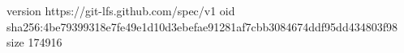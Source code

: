 version https://git-lfs.github.com/spec/v1
oid sha256:4be79399318e7fe49e1d10d3ebefae91281af7cbb3084674ddf95dd434803f98
size 174916
